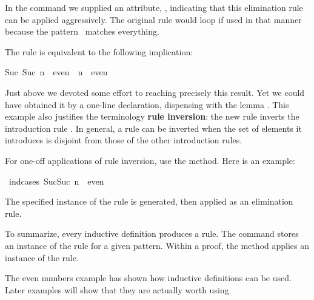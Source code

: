 \begin{isabellebody}
\begin{isamarkuptext}
In the  command we supplied an
attribute, ,
%
indicating that this elimination rule can be
applied aggressively.  The original
 rule would loop if used in that manner because the
pattern~ matches everything.

The rule  is equivalent to the following implication:
\begin{isabelle}%
Suc\ {\isacharparenleft}Suc\ n{\isacharparenright}\ {\isasymin}\ even\ {\isasymLongrightarrow}\ n\ {\isasymin}\ even%
\end{isabelle}
Just above we devoted some effort to reaching precisely
this result.  Yet we could have obtained it by a one-line declaration,
dispensing with the lemma . 
This example also justifies the terminology
\textbf{rule inversion}: the new rule inverts the introduction rule
.  In general, a rule can be inverted when the set of elements
it introduces is disjoint from those of the other introduction rules.

For one-off applications of rule inversion, use the  method. 
Here is an example:%
\end{isamarkuptext}%
\isamarkuptrue%
%
\isadelimproof
%
\endisadelimproof
%
\isatagproof
{}\isamarkupfalse%
\ {\isacharparenleft}ind{\isacharunderscore}cases\ {\isachardoublequoteopen}Suc{\isacharparenleft}Suc\ n{\isacharparenright}\ {\isasymin}\ even{\isachardoublequoteclose}{\isacharparenright}%
\endisatagproof
{\isafoldproof}%
%
\isadelimproof
%
\endisadelimproof
%
\begin{isamarkuptext}%
The specified instance of the  rule is generated, then applied
as an elimination rule.

To summarize, every inductive definition produces a  rule.  The
 command stores an instance of the
 rule for a given pattern.  Within a proof, the
 method applies an instance of the 
rule.

The even numbers example has shown how inductive definitions can be
used.  Later examples will show that they are actually worth using.%
%
%
\end{isamarkuptext}%
\isamarkuptrue%
%
\isadelimtheory
%
\endisadelimtheory
%
\isatagtheory
%
\endisatagtheory
{\isafoldtheory}%
%
\isadelimtheory
%
\endisadelimtheory
\end{isabellebody}%
